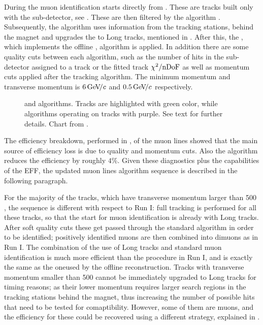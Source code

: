During \runone the muon identification starts directly from \veloTracks. These are tracks built only with
the \velo sub-detector, see . These \veloTracks are then filtered by the \mvm algorithm
\cite{LHCb-PUB-2011-017}. Subsequently, the \FwD algorithm uses information from the tracking stations, behind
the magnet and upgrades the \veloTracks to Long tracks, mentioned in . After this, the
\isMuon, which implements the offline \muonID, algorithm is applied. In addition there are some quality cuts
between each algorithm, such as the number of hits in the \velo sub-detector assigned to a track or the fitted
track $\chi^2/\rm nDoF$ as well as momentum cuts applied after the \FwD tracking algorithm. The minimum momentum
and transverse momentum is $6 {\mathrm{\,Ge\kern -0.1em V\!/}c}$ and $0.5 {\mathrm{\,Ge\kern -0.1em V\!/}c}$ respectively.

\begin{figure}[t]
  \centering
  \scalebox{0.97}{}
  \scalebox{0.97}{}
 \caption{\runone and \runtwo \hltone algorithms. Tracks are highlighted with green color, while algorithms
           operating on tracks with purple. See text for further details. Chart from \cite{kevinThesis}.}
  \label{hlt1_algo_seq}
\end{figure}

The efficiency breakdown, performed in \cite{kevinThesis}, of the \runone \hltone muon lines showed that the
main source of efficiency loss is due to quality and momentum cuts. Also the \mvm algorithm reduces the
efficiency by roughly $4\%$. Given these diagnostics plus the \runtwo capabilities of the EFF, the updated
\hltone muon lines algorithm sequence is described in the following paragraph.

For the majority of the tracks, which have transverse momentum larger than 500 \mevc, the sequence is different with respect to
Run I: full tracking is performed for all these tracks, so that the start for muon identification is already with Long tracks.
After soft quality cuts these get passed through the standard \isMuon algorithm in order to be identified;
positively identified muons are then combined into dimuons as in Run I.
The combination of the use of Long tracks and standard muon identification is much more efficient than the
procedure in Run I, and is exactly the same as the oneused by the offline reconstruction.
Tracks with transverse momentum smaller than 500 \mevc cannot be immediately upgraded to Long tracks
for timing reasons; as their lower momentum requires larger search regions in the tracking stations
behind the magnet, thus increasing the number of possible hits that need to be tested for comaptibility.
However, some of them are muons, and the efficiency for these could be recovered using a different strategy,
explained in .
